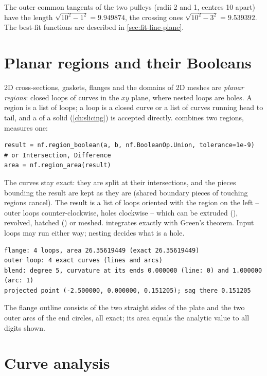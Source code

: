 The outer common tangents of the two pulleys (radii 2 and 1, centres 10 apart) have the length
$\sqrt{10^2 - 1^2} = 9.949874$, the crossing ones $\sqrt{10^2 - 3^2} = 9.539392$. The best-fit
functions are described in \cref{sec:fit-line-plane}.

\section{Planar regions and their Booleans}\label{sec:regions}

2D cross-sections, gaskets, flanges and the domains of 2D meshes are \emph{planar regions}:
closed loops of curves in the $xy$ plane, where nested loops are holes. A region is a list of
loops; a loop is a closed curve or a list of curves running head to tail, and a
 of a solid (\cref{ch:slicing}) is accepted directly.
 combines two regions,  measures one:

\begin{lstlisting}
result = nf.region_boolean(a, b, nf.BooleanOp.Union, tolerance=1e-9)  # or Intersection, Difference
area = nf.region_area(result)
\end{lstlisting}

The curves stay exact: they are split at their intersections, and the pieces bounding the
result are kept as they are (shared boundary pieces of touching regions cancel). The result is
a list of loops oriented with the region on the left -- outer loops counter-clockwise, holes
clockwise -- which can be extruded (), revolved, hatched () or
meshed.  integrates exactly with Green's theorem. Input loops may run either
way; nesting decides what is a hole.


\begin{lstlisting}[style=text]
flange: 4 loops, area 26.35619449 (exact 26.35619449)
outer loop: 4 exact curves (lines and arcs)
blend: degree 5, curvature at its ends 0.000000 (line: 0) and 1.000000 (arc: 1)
projected point (-2.500000, 0.000000, 0.151205); sag there 0.151205
\end{lstlisting}

The flange outline consists of the two straight sides of the plate and the two outer arcs of
the end circles, all exact; its area equals the analytic value to all digits shown.

\section{Curve analysis}\label{sec:curve-analysis}

